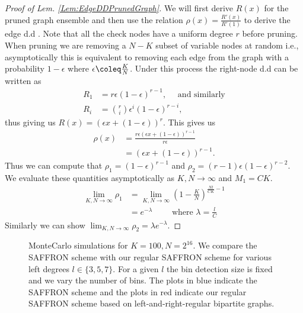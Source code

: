 \documentclass[conference,twocolumn]{IEEEtran}
\begin{document}
\begin{proof}[Proof of Lem. \ref{Lem:EdgeDDPrunedGraph}]
We will first derive $R(x)$ for the pruned graph ensemble and then use the relation\cite{richardson2008modern} $\rho(x)=\frac{R'(x)}{R'(1)}$ to derive the edge d.d . Note that all the check nodes have a uniform degree $r$ before pruning. When pruning we are removing a $N-K$ subset of variable nodes at random i.e., asymptotically this is equivalent to removing each edge from the graph with a probability $1-\epsilon$ where $\epsilon\coleq \frac{K}{N}$. Under this process the right-node d.d can be written as
\begin{align*}
R_1&=r\epsilon(1-\epsilon)^{r-1},\quad \text{ and similarly}\\
R_i &=\binom{r}{i} \epsilon^{i}(1-\epsilon)^{r-i},
\end{align*}
thus giving us $R(x)=(\epsilon x+(1-\epsilon))^{r}$. This gives us 
\begin{align*}
\rho(x)&=\frac{r\epsilon(\epsilon x+(1-\epsilon))^{r-1}}{r\epsilon}\\
          &=(\epsilon x+(1-\epsilon))^{r-1}.
\end{align*}
Thus we can compute that $\rho_1=(1-\epsilon)^{r-1}$ and $\rho_2=(r-1)\epsilon(1-\epsilon)^{r-2}$. We evaluate these quantities asymptotically as $K,N\rightarrow \infty$ and $M_1=CK$.
\begin{align*}
\lim_{K,N\rightarrow \infty} \rho_1&=\lim_{K,N\rightarrow \infty} (1-\frac{K}{N})^{\frac{Nl}{CK}-1}\\
&=e^{-\lambda} \qquad \text{ where } \lambda=\frac{l}{C}
\end{align*}
Similarly we can show $\lim_{K,N\rightarrow \infty}\rho_2=\lambda e^{-\lambda}$.
\end{proof}

\begin{figure}
\scalebox{1}{}
\caption{MonteCarlo simulations for $K=100, N=2^{16}$. We compare the SAFFRON scheme with our regular SAFFRON scheme for various left degrees $l\in\{3,5,7\}$. For a given $l$ the bin detection size is fixed and we vary the number of bins. The plots in blue indicate the SAFFRON scheme and the plots in red indicate our regular SAFFRON scheme based on left-and-right-regular bipartite graphs.}
\end{figure}



\end{document}
